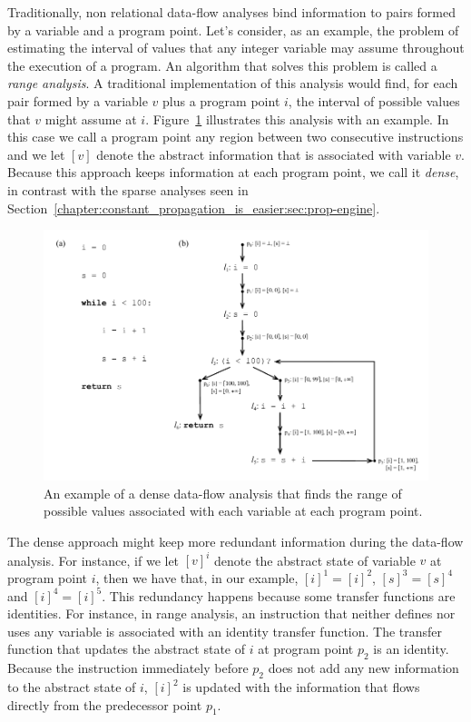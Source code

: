 Traditionally, non relational data-flow analyses bind information to pairs formed by a variable and a program point.
Let's consider, as an example, the problem of estimating the interval of values that any integer variable may assume throughout the execution of a program.
An algorithm that solves this problem is called a {\em range analysis}.
A traditional implementation of this analysis would find, for each pair formed by a variable $v$ plus a program point $i$, the interval of possible values that $v$ might assume at $i$.
Figure~\ref{fig:rangeAnalysis} illustrates this analysis with an example.
In this case we call a program point any region between two consecutive
instructions and we let $[v]$ denote the abstract information that is associated
with variable $v$.
Because this approach keeps information at each program point, we call it {\em dense}, in contrast with the sparse analyses seen in Section~\ref{chapter:constant_propagation_is_easier:sec:prop-engine}.

\begin{figure}[t!]
\centering
\includegraphics[width=\linewidth]{ProgramPoint}
\caption{An example of a dense data-flow analysis that finds the range of
possible values associated with each variable at each program point.}
\label{fig:rangeAnalysis}
\end{figure}

The dense approach might keep more redundant information during the
data-flow analysis.
For instance, if we let $[v]^i$ denote the abstract state of variable
$v$ at program point $i$, then we have that, in our example, $[i]^1 = [i]^2$,
$[s]^3 = [s]^4$ and $[i]^4 = [i]^5$.
This redundancy happens because some transfer functions are identities.
For instance, in range analysis, an instruction that neither defines nor uses any variable is associated with an identity transfer function.
The transfer function that updates the abstract state of $i$ at program point $p_2$ is an identity.
Because the instruction immediately before $p_2$ does not add any new information to the abstract state of $i$, $[i]^2$ is updated with the information that flows directly from the predecessor point $p_1$.

